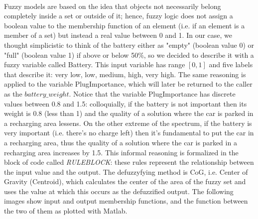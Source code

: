 \paragraph{} Fuzzy models are based on the idea that objects not necessarily belong completely inside a set or outside of it; hence, fuzzy logic does not assign a boolean value to the membership function of an element (i.e. if an element is a member of a set) but instead a real value between 0 and 1. In our case, we thought simplicistic to think of the battery either as "empty" (boolean value 0) or "full" (boolean value 1) if above or below 50\%, so we decided to describe it with a fuzzy variable called Battery. This input variable has range $[0, 1]$ and five labels that describe it: very low, low, medium, high, very high. The same reasoning is applied to the variable PlugImportance, which will later be returned to the caller as the $battery\_weight$. Notice that the variable PlugImportance has discrete values between 0.8 and 1.5: colloquially, if the battery is not important then its weight is 0.8 (less than 1) and the quality of a solution where the car is parked in a recharging area lessens. On the other extreme of the spectrum, if the battery is very important (i.e. there's no charge left) then it's fundamental to put the car in a recharging area, thus the quality of a solution where the car is parked in a recharging area increases by 1.5.
This informal reasoning is formalized in the block of code called \textit{RULEBLOCK}: these rules represent the relationship between the input value and the output. 
The defuzzyfying method is CoG, i.e. Center of Gravity (Centroid), which calculates the center of the area of the fuzzy set and uses the value at which this occurs as the defuzzified output.
The following images show input and output membership functions, and the function between the two of them as plotted with Matlab. 
